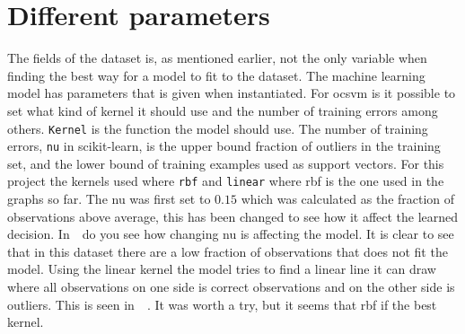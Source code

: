 \section{Different parameters}
The fields of the dataset is, as mentioned earlier, not the only variable when finding the best way for a model to fit to the dataset. The machine learning model has parameters that is given when instantiated. For \gls{ocsvm} is it possible to set what kind of kernel it should use and the number of training errors among others. \texttt{Kernel} is the function the model should use. The number of training errors, \texttt{nu} in scikit-learn, is the upper bound fraction of outliers in the training set, and the lower bound of training examples used as support vectors. For this project the kernels used where \texttt{rbf} and \texttt{linear} where rbf is the one used in the graphs so far. 
The nu was first set to $0.15$ which was calculated as the fraction of observations above average, this has been changed to see how it affect the learned decision. In $ $ $ $ do you see how changing nu is affecting the model. It is clear to see that in this dataset there are a low fraction of observations that does not fit the model. Using the linear kernel the model tries to find a linear line it can draw where all observations on one side is correct observations and on the other side is outliers. This is seen in $ $ $ $ $ $. It was worth a try, but it seems that rbf if the best kernel. 